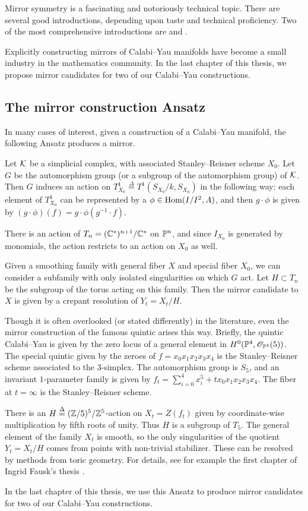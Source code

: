Mirror symmetry is a fascinating and notoriously technical topic. There are several good introductions, depending upon taste and technical proficiency. Two of the most comprehensive introductions are \cite{mirrorsymmetry} and \cite{mirrorsymmetry_vafa}.

Explicitly constructing mirrors of Calabi--Yau manifolds have become a small industry in the mathematics community. In the last chapter of this thesis, we propose mirror candidates for two of our Calabi--Yau constructions. 

\subsection{The mirror construction Ansatz}
\label{sec:the_mirror_construction_ansatz}

In many cases of interest, given a construction of a Calabi--Yau manifold, the following Ansatz produces a mirror.

Let $\K$ be a simplicial complex, with associated Stanley--Reisner scheme $X_0$. Let $G$ be the automorphism group (or a subgroup of the automorphism group) of $\K$. Then $G$ induces an action on $T^1_{X_0} \stackrel \Delta = T^1(S_{X_0}/k,S_{X_0})$ in the following way: each element of $T_{X_0}^1$ can be represented by a $\phi \in \Hom(I/I^2,A)$, and then $g \cdot \phi$ is given by $(g \cdot \phi)(f) = g \cdot \phi(g^{-1} \cdot f)$.

There is an action of $T_n=(\C^\ast)^{n+1}/\C^\ast$ on $\P^n$, and since $I_{X_0}$ is generated by monomials, the action restricts to an action on $X_0$ as well.

Given a smoothing family with general fiber $X$ and special fiber $X_0$, we can consider a subfamily with only isolated singularities on which $G$ act.  Let $H \subset T_n$ be the subgroup of the torus acting on this family. Then the mirror candidate to $X$ is given by a crepant resolution of $Y_t=X_t/H$.

Though it is often overlooked (or stated differently) in the literature, even the mirror construction of the famous quintic arises this way. Briefly, the quintic Calabi--Yau is given by the zero locus of a general element in $H^0(\P^4,\OO_{\P^4}(5))$. The special quintic given by the zeroes of $f=x_0x_1x_2x_3x_4$ is the Stanley--Reisner scheme associated to the $3$-simplex. The automorphism group is $S_5$, and an invariant $1$-parameter family is given by $f_t=\sum_{i=0}^4 x_i^5 + t x_0 x_1x_2x_3x_4$. The fiber at $t=\infty$ is the Stanley--Reisner scheme.

There is an $H \stackrel \Delta = (\Z/5)^5/\Z^5$-action on $X_t = Z(f_t)$ given by coordinate-wise multiplication by fifth roots of unity. Thus $H$ is a subgroup of $T_5$. The general element of the family $X_t$ is smooth, so the only singularities of the quotient $Y_t=X_t/H$ comes from points with non-trivial stabilizer. These can be resolved by methods from toric geometry. For details, see for example the first chapter of Ingrid Fausk's thesis \cite{fausk_thesis}.

In the last chapter of this thesis, we use this Ansatz to produce mirror candidates for two of our Calabi--Yau constructions.